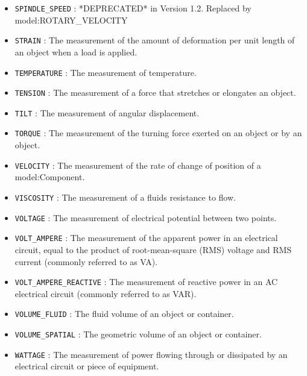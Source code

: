 \begin{itemize}
\item \texttt{SPINDLE_SPEED} : *DEPRECATED* in Version 1.2.  Replaced by {model:ROTARY_VELOCITY} 

\item \texttt{STRAIN} : The measurement of the amount of deformation per unit length of an object when a load is applied. 

\item \texttt{TEMPERATURE} : The measurement of temperature. 

\item \texttt{TENSION} : The measurement of a force that stretches or elongates an object. 

\item \texttt{TILT} : The measurement of angular displacement. 

\item \texttt{TORQUE} : The measurement of the turning force exerted on an object or by an object. 

\item \texttt{VELOCITY} : The measurement of the rate of change of position of a {model:Component}. 

\item \texttt{VISCOSITY} : The measurement of a fluids resistance to flow. 

\item \texttt{VOLTAGE} : The measurement of electrical potential between two points. 

\item \texttt{VOLT_AMPERE} : The measurement of the apparent power in an electrical circuit, equal to the product of root-mean-square (RMS) voltage and RMS current (commonly referred to as VA). 

\item \texttt{VOLT_AMPERE_REACTIVE} : The measurement of reactive power in an AC electrical circuit (commonly referred to as VAR). 

\item \texttt{VOLUME_FLUID} : The fluid volume of an object or container. 

\item \texttt{VOLUME_SPATIAL} : The geometric volume of an object or container. 

\item \texttt{WATTAGE} : The measurement of power flowing through or dissipated by an electrical circuit or piece of equipment. 

\end{itemize}

\FloatBarrier
